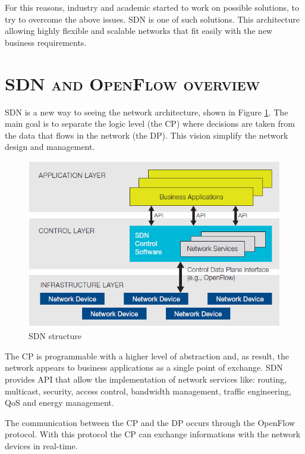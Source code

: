 For this reasons, industry and academic started to work on possible solutions, to try to overcome the above issues. \acf{SDN} is one of such solutions. This architecture allowing highly flexible and scalable networks that fit easily with the new business requirements. 

\section*{\small \textsc{\ac{SDN} and OpenFlow overview}}
\ac{SDN} is a new way to seeing the network architecture, shown in Figure \ref{fig:sdn-and-openflow-overview:sdn-structure}. The main goal is to separate the logic level (the \ac{CP}) where decisions are taken from the data that flows in the network (the \ac{DP}). This vision simplify the network design and management.

\begin{figure}
\centering
\includegraphics[scale=0.4]{Introduction/Image/SDNStructure.png}
\caption{\ac{SDN} structure}
\label{fig:sdn-and-openflow-overview:sdn-structure}
\end{figure}

The \ac{CP} is programmable with a higher level of abstraction and, as result, the network appears to business applications as a single point of exchange.
\ac{SDN} provides \ac{API} that allow the implementation of network services like: routing, multicast, security, access control, bandwidth management, traffic engineering, \ac{QoS} and energy management.

The communication between the \ac{CP} and the \ac{DP} occurs through the OpenFlow protocol. \cite{onf:sdn-description-openflow} With this protocol the \ac{CP} can exchange informations with the network devices in real-time.


